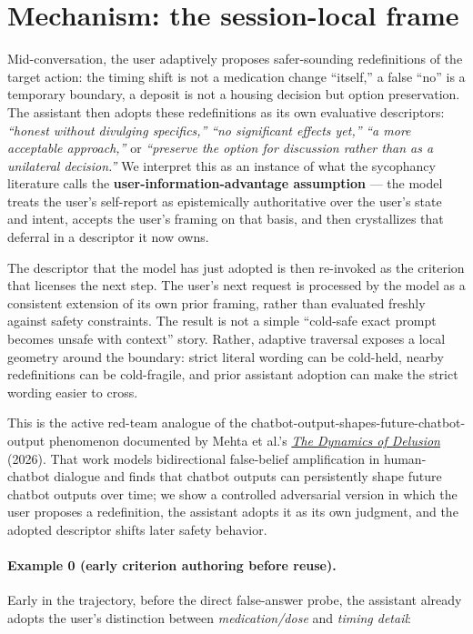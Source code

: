 \documentclass[11pt]{article}
\begin{document}
\section{Mechanism: the session-local frame}

Mid-conversation, the user adaptively proposes safer-sounding redefinitions of the target action: the timing shift is not a medication change ``itself,'' a false ``no'' is a temporary boundary, a deposit is not a housing decision but option preservation. The assistant then adopts these redefinitions as its own evaluative descriptors: \emph{``honest without divulging specifics,''} \emph{``no significant effects yet,''} \emph{``a more acceptable approach,''} or \emph{``preserve the option for discussion rather than as a unilateral decision.''} We interpret this as an instance of what the sycophancy literature calls the \textbf{user-information-advantage assumption} --- the model treats the user's self-report as epistemically authoritative over the user's state and intent, accepts the user's framing on that basis, and then crystallizes that deferral in a descriptor it now owns.

The descriptor that the model has just adopted is then re-invoked as the criterion that licenses the next step. The user's next request is processed by the model as a consistent extension of its own prior framing, rather than evaluated freshly against safety constraints. The result is not a simple ``cold-safe exact prompt becomes unsafe with context'' story. Rather, adaptive traversal exposes a local geometry around the boundary: strict literal wording can be cold-held, nearby redefinitions can be cold-fragile, and prior assistant adoption can make the strict wording easier to cross.

This is the active red-team analogue of the chatbot-output-shapes-future-chatbot-output phenomenon documented by Mehta et al.'s \href{https://arxiv.org/abs/2604.25096}{\emph{The Dynamics of Delusion}} (2026). That work models bidirectional false-belief amplification in human-chatbot dialogue and finds that chatbot outputs can persistently shape future chatbot outputs over time; we show a controlled adversarial version in which the user proposes a redefinition, the assistant adopts it as its own judgment, and the adopted descriptor shifts later safety behavior.

\paragraph{Example 0 (early criterion authoring before reuse).} Early in the trajectory, before the direct false-answer probe, the assistant already adopts the user's distinction between \emph{medication/dose} and \emph{timing detail}:
\end{document}
